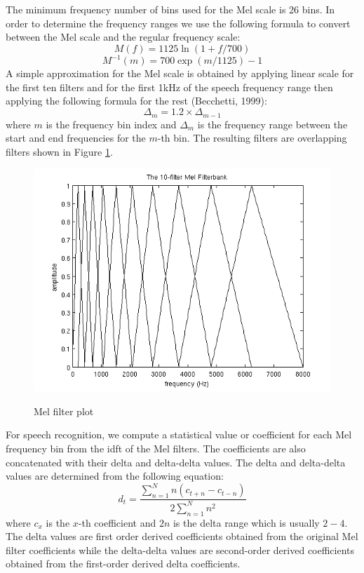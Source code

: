 The minimum frequency number of bins used for the Mel scale is 26 bins. In order to determine the frequency ranges we use the following formula to convert between the Mel scale and the regular frequency scale:
\begin{equation}
M(f)=1125\ln(1+f/700)
\label{eqn_c4_mel01}
\end{equation}
\begin{equation}
M^{−1}(m)=700\exp(m/1125)−1
\label{eqn_c4_mel02}
\end{equation}
A simple approximation for the Mel scale is obtained by applying linear scale for the first ten filters and for the first 1kHz of the speech frequency range then applying the following formula for the rest (Becchetti, 1999)\citep{becchetti1999behaviour}:
\begin{equation}
\Delta_m=1.2\times \Delta_{m-1}
\label{eqn_c4_mel03}
\end{equation}
where $m$ is the frequency bin index and  $\Delta_m$ is the frequency range between the start and end frequencies for the $m$-th bin. The resulting filters are overlapping filters shown in Figure \ref{fig_4_3_mfilt}.
\begin{figure}
\centering
  \includegraphics[width=12cm]{thesis/images/m-filters}\\
  \caption{Mel filter plot \citep{lyons_2012}}\label{fig_4_3_mfilt}
\end{figure}
For speech recognition, we compute a statistical value or coefficient for each Mel frequency bin from the \acrfull{idft} of the Mel filters.  The coefficients are also concatenated with their delta and delta-delta values.  The delta and delta-delta values are determined from the following equation:
 \begin{equation}
d_t=\frac{\sum_{n=1}^Nn(c_{t+n}−c_{t−n})}{2\sum_{n=1}^Nn^2}
\label{eqn_c4_mel04}
\end{equation}
where $c_x$ is the $x$-th coefficient and $2n$ is the delta range which is usually $2-4$. The delta values are first order derived coefficients obtained from the original Mel filter coefficients while the delta-delta values are second-order derived coefficients obtained from the first-order derived delta coefficients.

